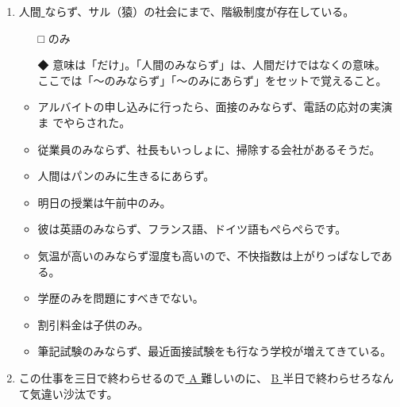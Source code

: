 \documentclass[
uplatex,
b5paper,
10pt,
dvipdfmx
]{jsbook}
\begin{document}
\begin{enumerate}
\item 人間\underline{  }ならず、サル（猿）の社会にまで、階級制度が存在している。
\begin{itemize}
\item[□] のみ
\item[◆] 意味は「だけ」。「人間のみならず」は、人間だけではなくの意味。
	  ここでは「〜のみならず」「〜のみにあらず」をセットで覚えること。
\end{itemize}
\begin{itemize}
\item アルバイトの申し込みに行ったら、面接のみならず、電話の応対の実演ま
      でやらされた。
\item 従業員のみならず、社長もいっしょに、掃除する会社があるそうだ。
\item 人間はパンのみに生きるにあらず。
\item 明日の授業は午前中のみ。
\item 彼は英語のみならず、フランス語、ドイツ語もぺらぺらです。
\item 気温が高いのみならず湿度も高いので、不快指数は上がりっぱなしである。
\item 学歴のみを問題にすべきでない。
\item 割引料金は子供のみ。
\item 筆記試験のみならず、最近面接試験をも行なう学校が増えてきている。
\end{itemize}


\item この仕事を三日で終わらせるので\underline{ A }難しいのに、
      \underline{ B }半日で終わらせろなんて気違い沙汰です。


\end{enumerate}
\end{document}
